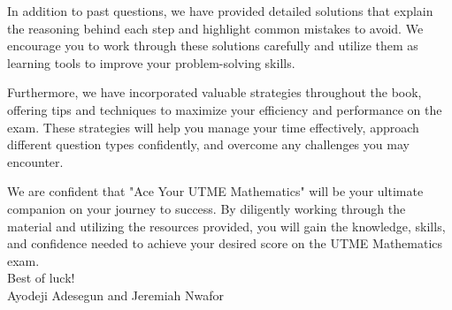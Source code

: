\documentclass[10pt, a4paper]{book}
\begin{document}
\begin{frontmatter}
In addition to past questions, we have provided detailed solutions that explain the reasoning behind each step and highlight common mistakes to avoid. We encourage you to work through these solutions carefully and utilize them as learning tools to improve your problem-solving skills.

Furthermore, we have incorporated valuable strategies throughout the book, offering tips and techniques to maximize your efficiency and performance on the exam. These strategies will help you manage your time effectively, approach different question types confidently, and overcome any challenges you may encounter.

We are confident that "Ace Your UTME Mathematics" will be your ultimate companion on your journey to success. By diligently working through the material and utilizing the resources provided, you will gain the knowledge, skills, and confidence needed to achieve your desired score on the UTME Mathematics exam.\\

Best of luck!\\

Ayodeji Adesegun and Jeremiah Nwafor
\clearpage
\end{frontmatter}

\mainmatter










\backmatter %

\printbibliography
\end{document}
